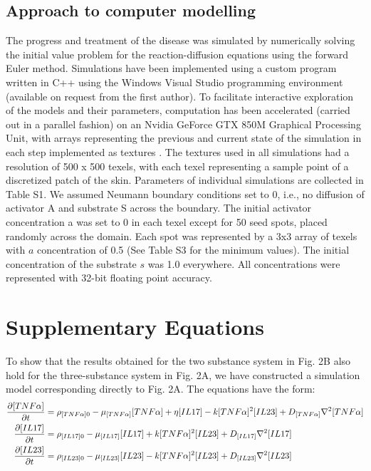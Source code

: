 \subsection{Approach to computer modelling}
The progress and treatment of the disease was simulated by numerically solving the initial value problem for the reaction-diffusion equations using the forward Euler method. Simulations have been implemented using a custom program written in C++ using the Windows Visual Studio programming environment (available on request from the first author). To facilitate interactive exploration of the models and their parameters, computation has been accelerated (carried out in a parallel fashion) on an Nvidia GeForce GTX 850M Graphical Processing Unit, with arrays representing the previous and current state of the simulation in each step implemented as textures \citep{dematte2010, harris2005}. The textures used in all simulations had a resolution of 500 x 500 texels, with each texel representing a sample point of a discretized patch of the skin. Parameters of individual simulations are collected in Table S1. We assumed Neumann boundary conditions set to 0, i.e., no diffusion of activator A and substrate S across the boundary. The initial activator concentration a was set to 0 in each texel except for 50 seed spots, placed randomly across the domain.  Each spot was represented by a 3x3 array of texels with $a$ concentration of 0.5 (See Table S3 for the minimum values). The initial concentration of the substrate $s$ was 1.0 everywhere.  All concentrations were represented with 32-bit floating point accuracy. 

\section{Supplementary Equations}
To show that the results obtained for the two substance system in Fig. 2B also hold for the three-substance system in Fig. 2A, we have constructed a simulation model corresponding directly to Fig. 2A. The equations have the form: 
\begin{equation}
	\begin{aligned}
		\frac{\partial[TNF\alpha]}{\partial t}&=\rho_{[TNF\alpha]0}-\mu_{[TNF\alpha]}[TNF\alpha]+\eta[IL17]-k[TNF\alpha]^2[IL23]+D_{[TNF\alpha]}\nabla^2[TNF\alpha]\\
		\frac{\partial[IL17]}{\partial t}     &=\rho_{[IL17]0}     -\mu_{[IL17]}[IL17]                     +k[TNF\alpha]^2[IL23]+D_{[IL17]}\nabla^2[IL17]\\
		\frac{\partial[IL23]}{\partial t}     &=\rho_{[IL23]0}     -\mu_{[IL23]}[IL23]                     -k[TNF\alpha]^2[IL23]+D_{[IL23]}\nabla^2[IL23]
	\end{aligned}
\end{equation}

